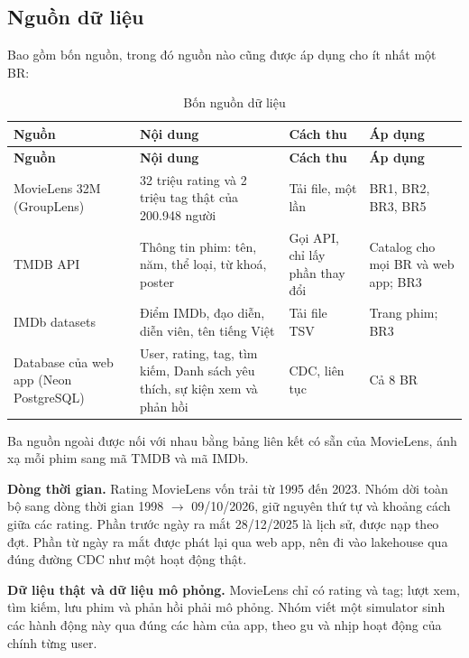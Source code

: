 \documentclass[a4paper,11pt]{article}
\newlength{\reporttablewidth}
\begin{document}
\subsection{Nguồn dữ liệu}\label{sec:2.3}

Bao gồm bốn nguồn, trong đó nguồn nào cũng được áp dụng cho ít nhất một BR:

\begingroup
\small
{}
\setlength{\tabcolsep}{4pt}
\renewcommand{\arraystretch}{1.18}
\setlength{\reporttablewidth}{\dimexpr\linewidth-6\tabcolsep\relax}
\begin{longtable}{@{}L{0.23\reporttablewidth} L{0.31\reporttablewidth} L{0.21\reporttablewidth} L{0.25\reporttablewidth}@{}}
\caption[Bốn nguồn dữ liệu (mục 2.3)]{Bốn nguồn dữ liệu}\label{tab:04} \\
\toprule
\textbf{Nguồn} & \textbf{Nội dung} & \textbf{Cách thu} & \textbf{Áp dụng} \\
\midrule
\endfirsthead
\toprule
\textbf{Nguồn} & \textbf{Nội dung} & \textbf{Cách thu} & \textbf{Áp dụng} \\
\midrule
\endhead
\midrule
\endfoot
\bottomrule
\endlastfoot
MovieLens 32M (GroupLens) & 32 triệu rating và 2 triệu tag thật của 200.948 người & Tải file, một lần & BR1, BR2, BR3, BR5 \\
TMDB API & Thông tin phim: tên, năm, thể loại, từ khoá, poster & Gọi API, chỉ lấy phần thay đổi & Catalog cho mọi BR và web app; BR3 \\
IMDb datasets & Điểm IMDb, đạo diễn, diễn viên, tên tiếng Việt & Tải file TSV & Trang phim; BR3 \\
Database của web app (Neon PostgreSQL) & User, rating, tag, tìm kiếm, Danh sách yêu thích, sự kiện xem và phản hồi & CDC, liên tục & Cả 8 BR \\
\end{longtable}
\endgroup

Ba nguồn ngoài được nối với nhau bằng bảng liên kết có sẵn của MovieLens, ánh xạ mỗi phim sang mã TMDB và mã IMDb.

\textbf{Dòng thời gian.} Rating MovieLens vốn trải từ 1995 đến 2023. Nhóm dời toàn bộ sang dòng thời gian 1998 \ensuremath{\rightarrow} 09/10/2026, giữ nguyên thứ tự và khoảng cách giữa các rating. Phần trước ngày ra mắt 28/12/2025 là lịch sử, được nạp theo đợt. Phần từ ngày ra mắt được phát lại qua web app, nên đi vào lakehouse qua đúng đường CDC như một hoạt động thật.

\textbf{Dữ liệu thật và dữ liệu mô phỏng.} MovieLens chỉ có rating và tag; lượt xem, tìm kiếm, lưu phim và phản hồi phải mô phỏng. Nhóm viết một simulator sinh các hành động này qua đúng các hàm của app, theo gu và nhịp hoạt động của chính từng user.
\end{document}
